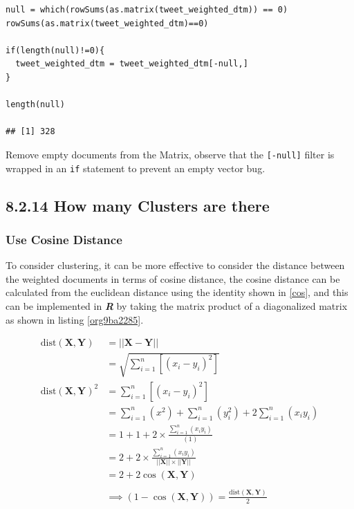 \documentclass[11pt]{article}
\begin{document}
\begin{listing}[htbp]
\begin{verbatim}
null = which(rowSums(as.matrix(tweet_weighted_dtm)) == 0)
rowSums(as.matrix(tweet_weighted_dtm)==0)

if(length(null)!=0){
  tweet_weighted_dtm = tweet_weighted_dtm[-null,]
}

length(null)

## [1] 328
\end{verbatim}
\caption{\label{org15331da}Remove empty documents from the Matrix, observe that the \texttt{[-null]} filter is wrapped in an \texttt{if} statement to prevent an empty vector bug.}
\end{listing}
\subsection{8.2.14 How many Clusters are there}
\label{sec:orgffa55d6}
\subsubsection{Use Cosine Distance}
\label{sec:org29b61da}
To consider clustering, it can be more effective to consider the distance between the weighted documents in terms of cosine distance, the cosine distance can be calculated from the euclidean distance using the identity shown in \eqref{cos}, and this can be implemented in \textbf{\emph{R}} by taking the matrix product of a diagonalized matrix as shown in listing \ref{org9ba2285}.

\begin{align}
\mathrm{dist}\left( \mathbf{X}, \mathbf{Y} \right)&= \left| \left| \mathbf{X}-\mathbf{Y} \right| \right| \\
&= \sqrt{\sum^{n}_{i= 1}   \left[ \left( x_i-y_i \right)^2 \right] } \\
\mathrm{dist}\left( \mathbf{X}, \mathbf{Y} \right)^2&= \sum^{n}_{i= 1}  \left[ \left( x_i-y_i \right)^2 \right] \\
&= \sum^{n}_{i= 1}   \left( x^2 \right)+  \sum^{n}_{i= 1}   \left( y_i^2 \right)+ 2 \sum^{n}_{i= 1}   \left( x_iy_i \right) \\
&= 1+ 1 +  2 \times  \frac{\sum^{n}_{i= 1}   \left( x_iy_i \right)}{\left( 1 \right) }\\
&= 2+ 2\times \frac{\sum^{n}_{i= 1}   \left( x_iy_i \right)}{\left| \left| \mathbf{X} \right| \right|\times \left| \left| \mathbf{Y} \right| \right|}\\
&= 2+ 2 \cos\left( \mathbf{X}, \mathbf{Y} \right)\\
\ \\
& \implies  \left( 1- \cos\left( \mathbf{X}, \mathbf{Y} \right) \right) = \frac{\mathrm{dist}\left( \mathbf{X}, \mathbf{Y} \right)}{2} \label{cos}
\end{align}
\end{document}
